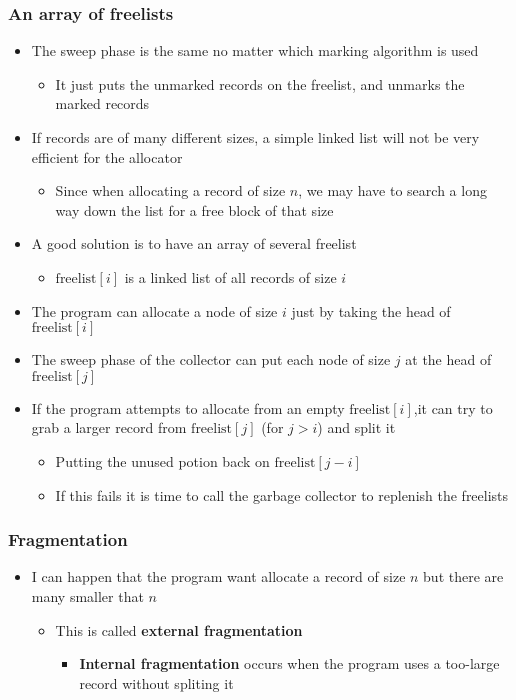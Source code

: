 \documentclass[11pt]{article}
\begin{document}
\subsubsection{An array of freelists}
\label{sec:org3abe8a9}
\begin{itemize}
\item The sweep phase is the same no matter which marking algorithm is used
\begin{itemize}
\item It just puts the unmarked records on the freelist, and unmarks the marked records
\end{itemize}
\item If records are of many different sizes, a simple linked list will not be very efficient for the allocator
\begin{itemize}
\item Since when allocating a record of size \(n\), we may have to search a long way down the list for a free block of that size
\end{itemize}
\item A good solution is to have an array of several freelist
\begin{itemize}
\item \(\text{freelist}[i]\) is a linked list of all records of size \(i\)
\end{itemize}
\item The program can allocate a node of size \(i\) just by taking the head of \(\text{freelist}[i]\)
\item The sweep phase of the collector can put each node of size \(j\) at the head of \(\text{freelist}[j]\)
\item If the program attempts to allocate from an empty \(\text{freelist}[i]\),it can try to grab a larger record from \(\text{freelist}[j]\) (for \(j > i\)) and split it
\begin{itemize}
\item Putting the unused potion back on \(\text{freelist}[j-i]\)
\item If this fails it is time to call the garbage collector to replenish the freelists
\end{itemize}
\end{itemize}

\subsubsection{Fragmentation}
\label{sec:org5878f64}
\begin{itemize}
\item I can happen that the program want allocate a record of size \(n\) but there are many smaller that \(n\) 
\begin{itemize}
\item This is called \textbf{external fragmentation}
\begin{itemize}
\item \textbf{Internal fragmentation} occurs when the program uses a too-large record without spliting it
\end{itemize}
\end{itemize}
\end{itemize}
\end{document}
